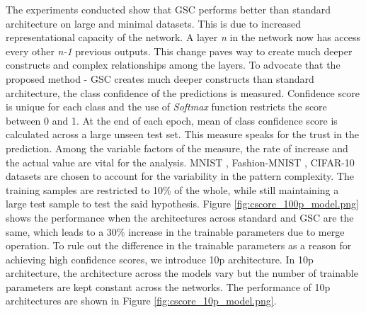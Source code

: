 \documentclass{article}
\begin{document}
The experiments conducted show that GSC performs better than standard architecture on large and minimal datasets. This is due to increased representational capacity of the network. A layer \emph{n} in the network now has access every other \emph{n-1} previous outputs. This change paves way to create much deeper constructs and complex relationships among the layers. To advocate that the proposed method - GSC creates much deeper constructs than standard architecture, the class confidence of the predictions is measured. Confidence score is unique for each class and the use of \emph{Softmax} function restricts the score between 0 and 1. At the end of each epoch, mean of class confidence score is calculated across a large unseen test set. This measure speaks for the trust in the prediction. Among the variable factors of the measure, the rate of increase and the actual value are vital for the analysis. MNIST \cite{LeCun1998GradientbasedLA}, Fashion-MNIST \cite{Xiao2017FashionMNISTAN}, CIFAR-10 datasets \cite{Krizhevsky2009LearningML} are chosen to account for the variability in the pattern complexity. The training samples are restricted to 10\% of the whole, while still maintaining a large test sample to test the said hypothesis. Figure \ref{fig:cscore_100p_model.png} shows the performance when the architectures across standard and GSC are the same, which leads to a 30\% increase in the trainable parameters due to merge operation. To rule out the difference in the trainable parameters as a reason for achieving high confidence scores, we introduce 10p architecture. In 10p architecture, the architecture across the models vary but the number of trainable parameters are kept constant across the networks. The performance of 10p architectures are shown in Figure \ref{fig:cscore_10p_model.png}.  

\end{document}
